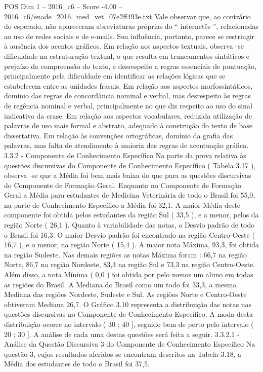 \begin{textsample}{POS Dim 1 – 2016\_c6 – Score -4.00 – 2016\_c6/enade\_2016\_med\_vet\_07e2ff493e.txt}
Vale observar que, ao contrário do esperado, não apareceram abreviaturas próprias do “ internetês ”, relacionadas ao uso de redes sociais e de e-mails.
Sua influência, portanto, parece se restringir à ausência dos acentos gráficos.
Em relação aos aspectos textuais, observa -se dificuldade na estruturação textual, o que resulta em truncamentos sintáticos e prejuízo da compreensão do texto, e desrespeito a regras essenciais de pontuação, principalmente pela dificuldade em identificar as relações lógicas que se estabelecem entre as unidades frasais.
Em relação aos aspectos morfossintáticos, domínio das regras de concordância nominal e verbal, mas desrespeito às regras de regência nominal e verbal, principalmente no que diz respeito ao uso do sinal indicativo da crase.
Em relação aos aspectos vocabulares, reduzida utilização de palavras de uso mais formal e abstrato, adequado à construção do texto de base dissertativa.
Em relação às convenções ortográficas, domínio da grafia das palavras, mas falta de atendimento à maioria das regras de acentuação gráfica. 3.3.2 - Componente de Conhecimento Específico Na parte da prova relativa às questões discursivas do Componente de Conhecimento Específico ( Tabela 3.17 ), observa -se que a Média foi bem mais baixa do que para as questões discursivas do Componente de Formação Geral.
Enquanto no Componente de Formação Geral a Média para estudantes de Medicina Veterinária de todo o Brasil foi 55,0, na parte de Conhecimento Específico a Média foi 32,1.
A maior Média deste componente foi obtida pelos estudantes da região Sul ( 33,5 ), e a menor, pelos da região Norte ( 26,1 ).
Quanto à variabilidade das notas, o Desvio padrão de todo o Brasil foi 16,3.
O maior Desvio padrão foi encontrado na região Centro-Oeste ( 16,7 ), e o menor, na região Norte ( 15,4 ).
A maior nota Máxima, 93,3, foi obtida na região Sudeste.
Nas demais regiões as notas Máxima foram : 66,7 na região Norte, 86,7 na região Nordeste, 83,3 na região Sul e 73,3 na região Centro-Oeste.
Além disso, a nota Mínima ( 0,0 ) foi obtida por pelo menos um aluno em todas as regiões do Brasil.
A Mediana do Brasil como um todo foi 33,3, a mesma Mediana das regiões Nordeste, Sudeste e Sul.
As regiões Norte e Centro-Oeste obtiveram Mediana 26,7.
O Gráfico 3.10 representa a distribuição das notas nas questões discursivas no Componente de Conhecimento Específico.
A moda desta distribuição ocorre no intervalo ( 30 ; 40 ], seguido bem de perto pelo intervalo ( 20 ; 30 ].
A análise de cada uma destas questões será feita a seguir. 3.3.2.1 - Análise da Questão Discursiva 3 do Componente de Conhecimento Específico Na questão 3, cujos resultados aferidos se encontram descritos na Tabela 3.18, a Média dos estudantes de todo o Brasil foi 37,5.

\end{textsample}
